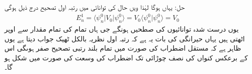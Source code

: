 حل: یہاں 
ہوگا لہٰذا    ویں حال کی توانائی میں رتبہ اول تصحیح درج ذیل ہوگی 
\begin{align*}
E_n^1 = \langle \psi_n^0 | V_0 | \psi_n^0 \rangle = V_0 \langle \psi_n^0 | \psi_n^0 \rangle = V_0
\end{align*}
یوں درست شدہ توانائیوں کی صطحیں   ہونگے جی ہاں تمام کی تمام  مقدار سے اوپر اٹھتی ہیں یہاں حیرانگی کی بات یہ ہے کہ رتبہ اول نظریہ بالکل ٹھیک جواب دیتا ہے یوں ظاہر ہے کہ مستقل اضطراب کی صورت میں تمام بلند رتبی تصحیح صفر ہوںگی  اس کے برعکس کنواں کی نصف چوڑائی تک اضطراب کی وسعت کی صورت میں شکل
 ہو گا۔

